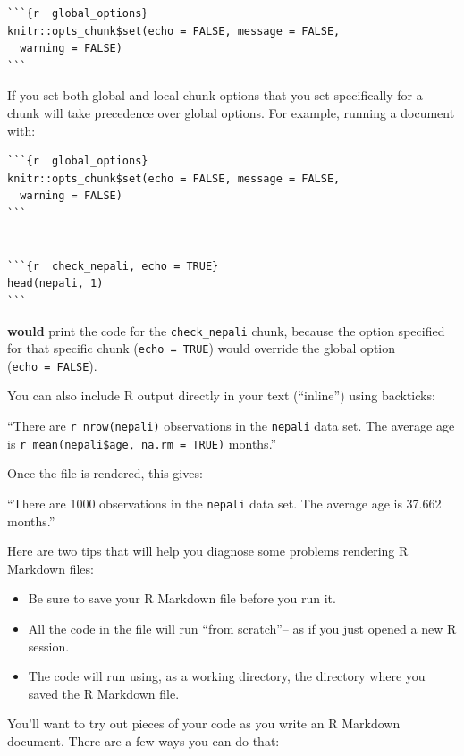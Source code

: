 \documentclass[]{book}
\providecommand{\tightlist}{%
  \setlength{\itemsep}{0pt}\setlength{\parskip}{0pt}}
\theoremstyle{definition}
\theoremstyle{definition}
\theoremstyle{definition}
\theoremstyle{remark}
\begin{document}
\begin{verbatim}
```{r  global_options}
knitr::opts_chunk$set(echo = FALSE, message = FALSE,
  warning = FALSE)
```
\end{verbatim}

If you set both global and local chunk options that you set specifically
for a chunk will take precedence over global options. For example,
running a document with:

\begin{verbatim}
```{r  global_options}
knitr::opts_chunk$set(echo = FALSE, message = FALSE,
  warning = FALSE)
```


```{r  check_nepali, echo = TRUE}
head(nepali, 1)
```
\end{verbatim}

\textbf{would} print the code for the \texttt{check\_nepali} chunk,
because the option specified for that specific chunk
(\texttt{echo\ =\ TRUE}) would override the global option
(\texttt{echo\ =\ FALSE}).

You can also include R output directly in your text (``inline'') using
backticks: \bigskip

``There are \texttt{\textasciigrave{}r\ nrow(nepali)\textasciigrave{}}
observations in the \texttt{nepali} data set. The average age is
\texttt{\textasciigrave{}r\ mean(nepali\$age,\ na.rm\ =\ TRUE)\textasciigrave{}}
months.''

\bigskip

Once the file is rendered, this gives: \bigskip

``There are 1000 observations in the \texttt{nepali} data set. The
average age is 37.662 months.''

\bigskip

Here are two tips that will help you diagnose some problems rendering R
Markdown files:

\begin{itemize}
\tightlist
\item
  Be sure to save your R Markdown file before you run it.
\item
  All the code in the file will run ``from scratch''-- as if you just
  opened a new R session.
\item
  The code will run using, as a working directory, the directory where
  you saved the R Markdown file.
\end{itemize}

You'll want to try out pieces of your code as you write an R Markdown
document. There are a few ways you can do that:
\end{document}
